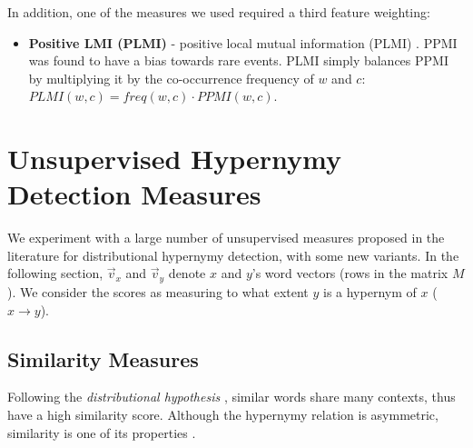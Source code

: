 \documentclass[11pt]{article}
\begin{document}
\vspace*{-2pt}
In addition, one of the measures we used \cite{santus2014chasing} required a third feature weighting:

\begin{itemize}
\vspace*{-2pt}
\item \textbf{Positive LMI (PLMI)} - positive local mutual information (PLMI) \cite{evert2005statistics,evert2008corpora}. PPMI was found to have a bias towards rare events. PLMI simply balances PPMI by multiplying it by the co-occurrence frequency of $w$ and $c$: $PLMI(w,c) = freq(w,c) \cdot PPMI(w,c)$.

\end{itemize}
\vspace*{-2pt}

\setlength{\abovedisplayskip}{0.01cm}
\setlength{\belowdisplayskip}{0.01cm}

\section{Unsupervised Hypernymy Detection Measures}
\label{sec:measures}

We experiment with a large number of unsupervised measures proposed in the literature for distributional hypernymy detection, with some new variants. In the following section, $\vec{v}_x$ and $\vec{v}_y$ denote $x$ and $y$'s word vectors (rows in the matrix $M$). We consider the scores as measuring to what extent $y$ is a hypernym of $x$ ($x \rightarrow y$). 

\newcommand{\norm}[1]{\left\lVert #1 \right\rVert}

\subsection{Similarity Measures}
\label{sec:similarity_measures}

Following the \emph{distributional hypothesis} \cite{harris1954distributional}, similar words share many contexts, thus have a high similarity score. Although the hypernymy relation is asymmetric, similarity is one of its properties \cite{santus2014chasing}.
\end{document}
